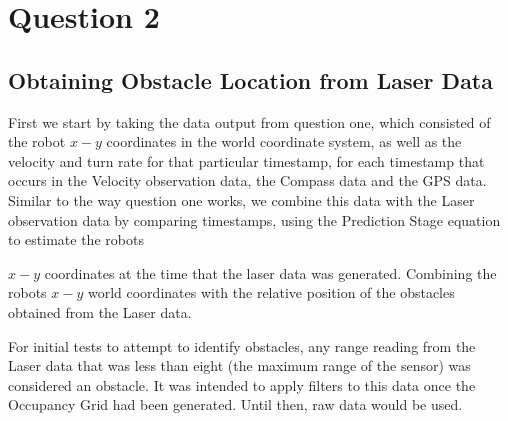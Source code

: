 \pagebreak
\section{Question 2}
	
	\subsection{Obtaining Obstacle Location from Laser Data}
	
	First we start by taking the data output from question one, which consisted of the robot ${x-y}$ coordinates in the world coordinate system, as well as the velocity and turn rate for that particular timestamp, for each timestamp that occurs in the Velocity observation data, the Compass data and the GPS data. \newline Similar to the way question one works, we combine this data with the Laser observation data by comparing timestamps, using the Prediction Stage equation to estimate the robots {${x-y}$ coordinates at the time that the laser data was generated. Combining the robots ${x-y}$ world coordinates with the relative position of the obstacles obtained from the Laser data. \newline
				
	For initial tests to attempt to identify obstacles, any range reading from the Laser data that was less than eight (the maximum range of the sensor) was considered an obstacle. It was intended to apply filters to this data once the Occupancy Grid had been generated. Until then, raw data would be used.\newline
	
	
	
	
}
